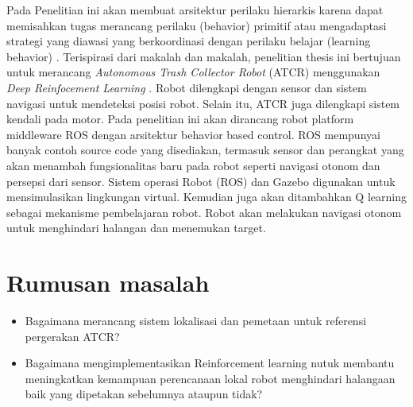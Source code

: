  
 Pada Penelitian ini akan membuat arsitektur perilaku hierarkis karena dapat memisahkan tugas merancang perilaku (behavior) primitif atau mengadaptasi strategi yang diawasi yang berkoordinasi dengan perilaku belajar (learning behavior)  \cite{Hoffmann2003}. Terispirasi dari makalah \cite{Bai2018} dan makalah\cite{Kong2009,Michael2008,Wang2008,Arai2019}, penelitian thesis ini bertujuan untuk merancang \textit{Autonomous Trash Collector Robot} (ATCR) menggunakan \textit{Deep Reinfocement Learning}  \cite{Mustafa2019}. Robot dilengkapi dengan sensor  dan sistem navigasi untuk mendeteksi posisi robot. Selain itu, ATCR juga dilengkapi sistem kendali pada motor\cite{Saputra2019}. Pada penelitian ini akan dirancang robot platform middleware ROS dengan arsitektur behavior based control. ROS mempunyai banyak contoh source code yang disediakan, termasuk sensor dan perangkat yang akan menambah fungsionalitas baru pada robot seperti navigasi otonom dan persepsi dari sensor. Sistem operasi Robot (ROS) dan Gazebo digunakan untuk mensimulasikan lingkungan virtual. Kemudian juga akan ditambahkan Q learning sebagai mekanisme pembelajaran robot. Robot akan melakukan navigasi otonom untuk menghindari halangan dan menemukan target.





\section{Rumusan masalah}
\begin{itemize}
	\item Bagaimana merancang sistem lokalisasi dan pemetaan untuk referensi pergerakan ATCR?
	\item Bagaimana mengimplementasikan Reinforcement learning  nutuk membantu meningkatkan kemampuan perencanaan lokal robot menghindari halangaan baik yang dipetakan sebelumnya ataupun tidak?
\end{itemize} 


